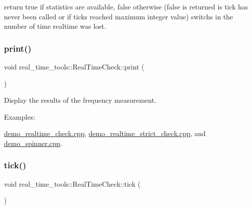 return true if statistics are available, false otherwise (false is returned is tick has never been called or if ticks reached maximum integer value) switchs in the number of time realtime was lost. \mbox{\label{classreal__time__tools_1_1RealTimeCheck_a9c9c68da79843098085204095286a143}} 
\subsubsection{\texorpdfstring{print()}{print()}}
{\footnotesize\ttfamily void real\+\_\+time\+\_\+tools\+::\+Real\+Time\+Check\+::print (\begin{DoxyParamCaption}{ }\end{DoxyParamCaption})}

Display the results of the frequency measurement. \begin{Desc}
\item[Examples\+: ]\par
\hyperlink{demo_realtime_check_8cpp-example}{demo\+\_\+realtime\+\_\+check.\+cpp}, \hyperlink{demo_realtime_strict_check_8cpp-example}{demo\+\_\+realtime\+\_\+strict\+\_\+check.\+cpp}, and \hyperlink{demo_spinner_8cpp-example}{demo\+\_\+spinner.\+cpp}.\end{Desc}
\mbox{\label{classreal__time__tools_1_1RealTimeCheck_a83fdf97352d36aa20e482d7dfae442d5}} 
\subsubsection{\texorpdfstring{tick()}{tick()}}
{\footnotesize\ttfamily void real\+\_\+time\+\_\+tools\+::\+Real\+Time\+Check\+::tick (\begin{DoxyParamCaption}{ }\end{DoxyParamCaption})}

